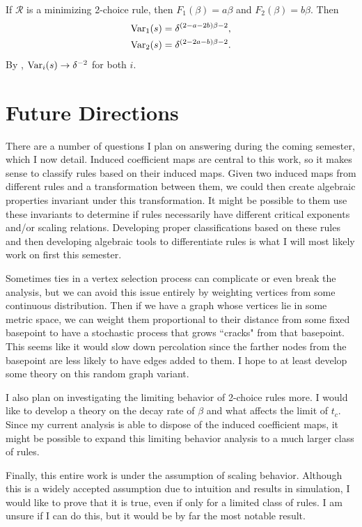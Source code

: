 \documentclass[twoside,10pt]{article}
\begin{document}
\begin{ex}[]
	If $\mathcal{R}$ is a minimizing 2-choice rule, then $F_1(\beta) = a \beta$ and $F_2(\beta)=b \beta$. Then
	\begin{align*}
		\operatorname{Var}_1(s) &= \delta^{(2-a-2b)\beta-2},\\
		\operatorname{Var}_2(s) &= \delta^{(2-2a-b)\beta-2}.
	\end{align*}
	By , $\operatorname{Var}_i(s) \to \delta^{-2}$ for both $i$.
\end{ex}

\section{Future Directions}

There are a number of questions I plan on answering during the coming semester, which I now detail. Induced coefficient maps are central to this work, so it makes sense to classify rules based on their induced maps. Given two induced maps from different rules and a transformation between them, we could then create algebraic properties invariant under this transformation. It might be possible to them use these invariants to determine if rules necessarily have different critical exponents and/or scaling relations. Developing proper classifications based on these rules and then developing algebraic tools to differentiate rules is what I will most likely work on first this semester.

Sometimes ties in a vertex selection process can complicate or even break the analysis, but we can avoid this issue entirely by weighting vertices from some continuous distribution. Then if we have a graph whose vertices lie in some metric space, we can weight them proportional to their distance from some fixed basepoint to have a stochastic process that grows ``cracks" from that basepoint. This seems like it would slow down percolation since the farther nodes from the basepoint are less likely to have edges added to them. I hope to at least develop some theory on this random graph variant.

I also plan on investigating the limiting behavior of 2-choice rules more. I would like to develop a theory on the decay rate of $\beta$ and what affects the limit of $t_{c}$. Since my current analysis is able to dispose of the induced coefficient maps, it might be possible to expand this limiting behavior analysis to a much larger class of rules.

Finally, this entire work is under the assumption of scaling behavior. Although this is a widely accepted assumption due to intuition and results in simulation, I would like to prove that it is true, even if only for a limited class of rules. I am unsure if I can do this, but it would be by far the most notable result.

\printbibliography
\end{document}
